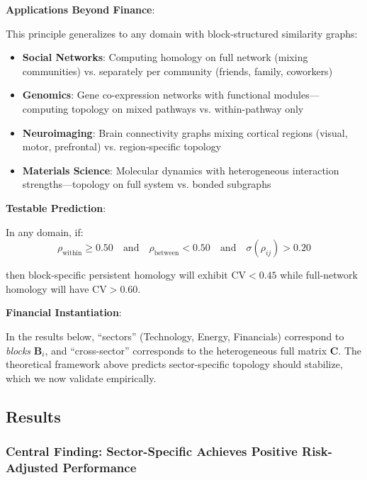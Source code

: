 \textbf{Applications Beyond Finance}:

This principle generalizes to any domain with block-structured similarity graphs:

\begin{itemize}
\item \textbf{Social Networks}: Computing homology on full network (mixing communities) vs. separately per community (friends, family, coworkers)

\item \textbf{Genomics}: Gene co-expression networks with functional modules---computing topology on mixed pathways vs. within-pathway only

\item \textbf{Neuroimaging}: Brain connectivity graphs mixing cortical regions (visual, motor, prefrontal) vs. region-specific topology

\item \textbf{Materials Science}: Molecular dynamics with heterogeneous interaction strengths---topology on full system vs. bonded subgraphs
\end{itemize}

\textbf{Testable Prediction}:

In any domain, if:
\begin{equation}
\rho_{\text{within}} \geq 0.50 \quad \text{and} \quad \rho_{\text{between}} < 0.50 \quad \text{and} \quad \sigma(\rho_{ij}) > 0.20
\end{equation}

then block-specific persistent homology will exhibit $\text{CV} < 0.45$ while full-network homology will have $\text{CV} > 0.60$.

\textbf{Financial Instantiation}:

In the results below, ``sectors'' (Technology, Energy, Financials) correspond to \textit{blocks} $\mathbf{B}_i$, and ``cross-sector'' corresponds to the heterogeneous full matrix $\mathbf{C}$. The theoretical framework above predicts sector-specific topology should stabilize, which we now validate empirically.

\subsection{Results}

\subsubsection{Central Finding: Sector-Specific Achieves Positive Risk-Adjusted Performance}

